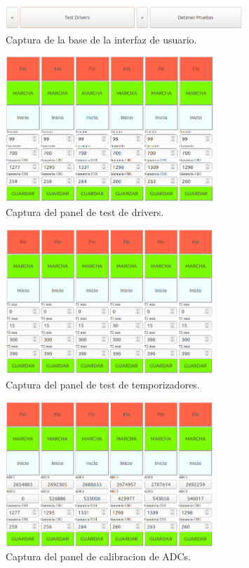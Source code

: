 \begin{figure}[H]
	\centering
	\includegraphics[width=0.8\textwidth]{./Figures/Base.png}
	\caption{Captura de la base de la interfaz de usuario.}
	\label{fig:Base}
\end{figure}

\begin{figure}[H]
	\centering
	\includegraphics[width=0.7\textwidth]{./Figures/PanelDriver.png}
	\caption{Captura del panel de test de drivers.}
	\label{fig:PanelDriver}
\end{figure}

\begin{figure}[H]
	\centering
	\includegraphics[width=0.7\textwidth]{./Figures/PanelTemp.png}
	\caption{Captura del panel de test de temporizadores.}
	\label{fig:PanelTemp}
\end{figure}

\begin{figure}[H]
	\centering
	\includegraphics[width=0.7\textwidth]{./Figures/PanelCal.png}
	\caption{Captura del panel de calibracion de ADCs.}
	\label{fig:PanelCal}
\end{figure}